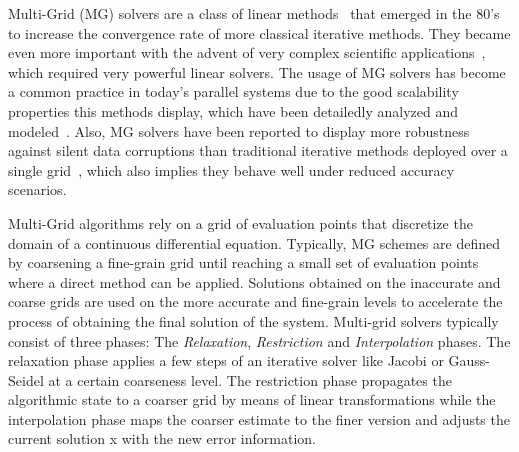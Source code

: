Multi-Grid (MG) solvers are a class of linear methods~\cite{Hackbusch1991} that emerged in the 80's to increase the convergence rate of more classical iterative methods. 
They became even more important with the advent of very complex scientific applications~\cite{Ashby1996}, which required very powerful linear solvers. 
The usage of MG solvers has become a common practice in today's parallel systems due to the good scalability properties this methods display, which have been detailedly analyzed and modeled~\cite{Gahvari11}.
Also, MG solvers have been reported to display more robustness against silent data corruptions than traditional iterative methods deployed over a single grid~\cite{Casas12}, which also implies they behave well under reduced accuracy scenarios.

Multi-Grid algorithms rely on a grid of evaluation points that discretize the domain of a continuous differential equation.
Typically, MG schemes are defined by coarsening a fine-grain grid until reaching a small set of evaluation points where a direct method can be applied.
Solutions obtained on the inaccurate and coarse grids are used on the more accurate and fine-grain levels to accelerate the process of obtaining the final solution of the system. 
Multi-grid solvers typically consist of three phases: The \textit{Relaxation}, \textit{Restriction} and \textit{Interpolation} phases.
The relaxation phase applies a few steps of
an iterative solver like Jacobi or Gauss-Seidel at a certain coarseness level. 
The restriction phase propagates the algorithmic state to a coarser grid by means of linear transformations while the interpolation phase
maps the coarser estimate to the finer version and adjusts the current solution x with the new error information.

